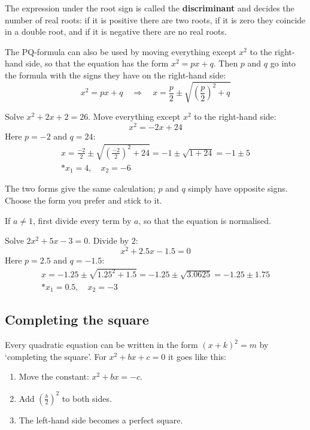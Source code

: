 The expression under the root sign is called the \textbf{discriminant} and decides the number of
real roots: if it is positive there are two roots, if it is zero they coincide in a double root,
and if it is negative there are no real roots.

The PQ-formula can also be used by moving everything except $x^2$ to the right-hand side, so that
the equation has the form $x^2 = px + q$. Then $p$ and $q$ go into the formula with the signs they
have on the right-hand side:
\[
  x^2 = px + q \quad \Rightarrow \quad x = \frac{p}{2} \pm \sqrt{\left(\frac{p}{2}\right)^2 + q}
\]

\begin{exempel}
Solve $x^2 + 2x + 2 = 26$. Move everything except $x^2$ to the right-hand side:
\[
  x^2 = -2x + 24
\]
Here $p = -2$ and $q = 24$:
\begin{gather*}
  x = \frac{-2}{2} \pm \sqrt{\left(\frac{-2}{2}\right)^2 + 24} = -1 \pm \sqrt{1 + 24} = -1 \pm 5 \\*
  x_1 = 4, \quad x_2 = -6
\end{gather*}
\end{exempel}

The two forms give the same calculation; $p$ and $q$ simply have opposite signs. Choose the form
you prefer and stick to it.

If $a \neq 1$, first divide every term by $a$, so that the equation is normalised.

\begin{exempel}
Solve $2x^2 + 5x - 3 = 0$. Divide by $2$:
\[
  x^2 + 2.5x - 1.5 = 0
\]
Here $p = 2.5$ and $q = -1.5$:
\begin{gather*}
  x = -1.25 \pm \sqrt{1.25^2 + 1.5} = -1.25 \pm \sqrt{3.0625} = -1.25 \pm 1.75 \\*
  x_1 = 0.5, \quad x_2 = -3
\end{gather*}
\end{exempel}

\subsection{Completing the square}
\label{c6:sec:kvadratkomplettering}
Every quadratic equation can be written in the form $(x + k)^2 = m$ by ‘completing the square’.
For $x^2 + bx + c = 0$ it goes like this:
\begin{enumerate}
  \item Move the constant: $x^2 + bx = -c$.
  \item Add $\left(\frac{b}{2}\right)^2$ to both sides.
  \item The left-hand side becomes a perfect square.
\end{enumerate}

